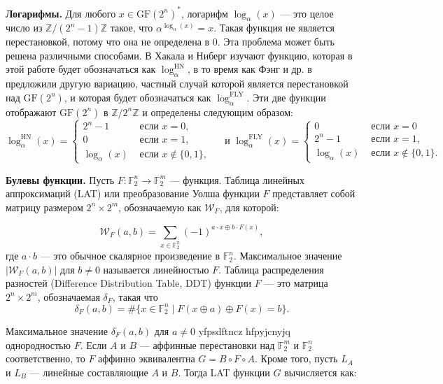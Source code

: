 \textbf{Логарифмы.} Для любого \(x \in \text{GF}(2^n)^*\), логарифм \(\log_\alpha(x)\) — это целое число из \(\mathbb{Z}/(2^n - 1)\mathbb{Z}\) такое, что \(\alpha^{\log_\alpha(x)} = x\). Такая функция не является перестановкой, потому что она не определена в 0. Эта проблема может быть решена различными способами. В \cite{HN10} Хакала и Ниберг изучают функцию, которая в этой работе будет обозначаться как \(\log_{\alpha}^{\text{HN}}\), в то время как Фэнг и др. в \cite{FLY09} предложили другую вариацию, частный случай которой является перестановкой над \(\text{GF}(2^n)\), и которая будет обозначаться как \(\log_{\alpha}^{\text{FLY}}\). Эти две функции отображают \(\text{GF}(2^n)\) в \(\mathbb{Z}/2^n\mathbb{Z}\) и определены следующим образом:
$$
\log _\alpha^{\mathrm{HN}}(x)=\left\{\begin{array}{ll}
        2^n-1 & \text { если } x=0, \\
        0 & \text { если } x=1, \\
        \log _\alpha(x) & \text { если } x \notin\{0,1\},
        \end{array} \quad \text { и } \log _\alpha^{\mathrm{FLY}}(x)= \begin{cases}0 & \text { если } x=0 \\
        2^n-1 & \text { если } x=1, \\
        \log _\alpha(x) & \text { если } x \notin\{0,1\} .\end{cases}\right.
$$

\textbf{Булевы функции.} Пусть \( F : \mathbb{F}_2^n \rightarrow \mathbb{F}_2^m \) — функция. Таблица линейных аппроксимаций (LAT) или преобразование Уолша функции \( F \) представляет собой матрицу размером \( 2^n \times 2^m \), обозначаемую как \( \mathcal{W}_F \), для которой:

\[
\mathcal{W}_F(a, b) = \sum_{x \in \mathbb{F}_2^n} (-1)^{a \cdot x \oplus b \cdot F(x)},
\] где \( a \cdot b \) — это обычное скалярное произведение в \(\mathbb{F}_2^n\). Максимальное значение \(|\mathcal{W}_F(a, b)|\) для \(b \neq 0\) называется линейностью \( F \). Таблица распределения разностей (Difference Distribution Table, DDT) функции \( F \) — это матрица \( 2^n \times 2^m \), обозначаемая \(\delta_F\), такая что
\[
\delta_F(a, b) = \# \{ x \in \mathbb{F}_2^n \mid F(x \oplus a) \oplus F(x) = b \}.
\]

Максимальное значение \(\delta_F(a, b)\) для \(a \neq 0\) yfpsdftncz hfpyjcnyjq однородностью \( F \). Если \( A \) и \( B \) — аффинные перестановки над \(\mathbb{F}_2^m\) и \(\mathbb{F}_2^n\) соответственно, то \( F \) аффинно эквивалентна \( G = B \circ F \circ A \). Кроме того, пусть \( L_A \) и \( L_B \) — линейные составляющие \( A \) и \( B \). Тогда LAT функции \( G \) вычисляется как:

